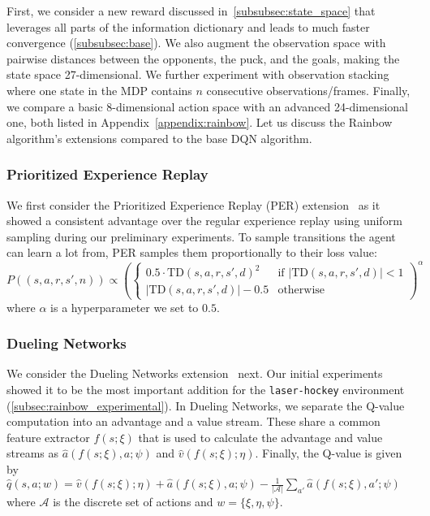 First, we consider a new reward discussed in~\ref{subsubsec:state_space} that leverages all parts of the information dictionary and leads to much faster convergence (\ref{subsubsec:base}). We also augment the observation space with pairwise distances between the opponents, the puck, and the goals, making the state space 27-dimensional. We further experiment with observation stacking where one state in the MDP contains $n$ consecutive observations/frames. Finally, we compare a basic 8-dimensional action space with an advanced 24-dimensional one, both listed in Appendix~\ref{appendix:rainbow}. Let us discuss the Rainbow algorithm's extensions compared to the base DQN algorithm.

\subsubsection{Prioritized Experience Replay}

We first consider the Prioritized Experience Replay (PER) extension~\cite{schaul2016prioritized} as it showed a consistent advantage over the regular experience replay using uniform sampling during our preliminary experiments. To sample transitions the agent can learn a lot from, PER samples them proportionally to their loss value: $P((s, a, r, s', n)) \propto \left(\begin{cases}0.5 \cdot \text{TD}(s, a, r, s', d)^2 & \text{if } |\text{TD}(s, a, r, s', d)| < 1 \\ |\text{TD}(s, a, r, s', d)| - 0.5 & \text{otherwise}\end{cases}\right)^{\alpha}$ where $\alpha$ is a hyperparameter we set to $0.5$.

\subsubsection{Dueling Networks}

We consider the Dueling Networks extension~\cite{wang2016:DDQN} next. Our initial experiments showed it to be the most important addition for the \texttt{laser-hockey} environment (\ref{subsec:rainbow_experimental}). In Dueling Networks, we separate the Q-value computation into an advantage and a value stream. These share a common feature extractor $f(s; \xi)$ that is used to calculate the advantage and value streams as $\hat{a}(f(s; \xi), a; \psi)$ and $\hat{v}(f(s; \xi); \eta)$. Finally, the Q-value is given by $\hat{q}(s, a; w) = \hat{v}(f(s; \xi); \eta) + \hat{a}(f(s; \xi), a; \psi) - \frac{1}{|\mathcal{A}|}\sum_{a'} \hat{a}(f(s; \xi), a'; \psi)$ where $\mathcal{A}$ is the discrete set of actions and $w = \{\xi, \eta, \psi\}$.

